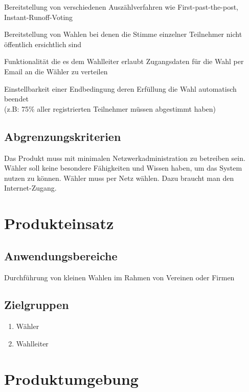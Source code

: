 \documentclass[parskip=full,11pt,twoside]{scrartcl}
\begin{document}
Bereitstellung von verschiedenen Auszählverfahren wie First-past-the-post, Instant-Runoff-Voting

Bereitstellung von Wahlen bei denen die Stimme einzelner Teilnehmer nicht öffentlich ersichtlich sind

Funktionalität die es dem Wahlleiter erlaubt Zugangsdaten für die Wahl per Email an die Wähler zu verteilen

Einstellbarkeit einer Endbedingung deren Erfüllung die Wahl automatisch beendet \\(z.B: 75\% aller registrierten Teilnehmer müssen abgestimmt haben)

\subsection{Abgrenzungskriterien}
Das Produkt muss mit minimalen Netzwerkadministration zu betreiben sein.
Wähler soll keine besondere Fähigkeiten und Wissen  haben, um das System nutzen zu können.
Wähler muss per Netz wählen. Dazu braucht man den Internet-Zugang.

\section{Produkteinsatz}

\subsection{Anwendungsbereiche}
Durchführung von kleinen Wahlen im Rahmen von Vereinen oder Firmen

\subsection{Zielgruppen}
\begin{enumerate}
  \item Wähler
  \item Wahlleiter
\end{enumerate}

\section{Produktumgebung}
\end{document}
